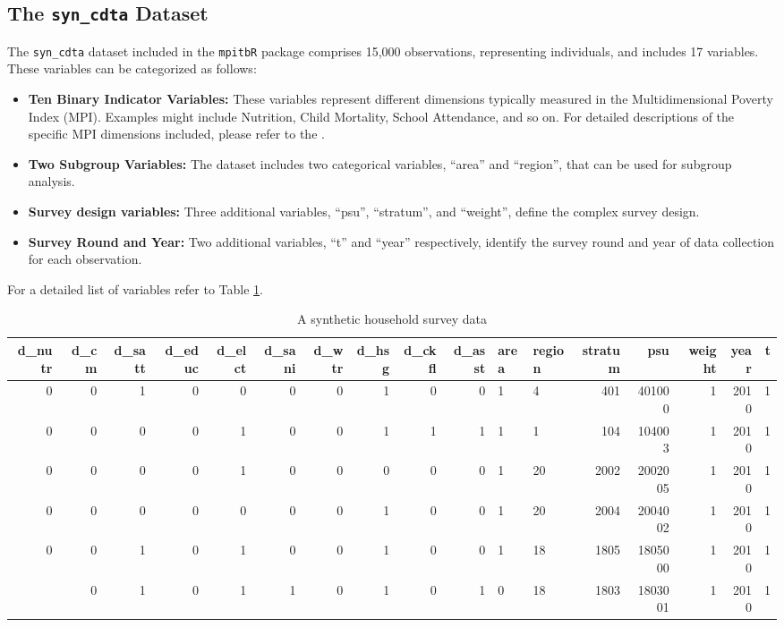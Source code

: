 \subsection{\texorpdfstring{The \texttt{syn\_cdta} Dataset}{The syn\_cdta Dataset}}\label{the-syn_cdta-dataset}

The \texttt{syn\_cdta} dataset included in the \texttt{mpitbR} package comprises 15,000 observations, representing individuals, and includes 17 variables. These variables can be categorized as follows:

\begin{itemize}
\item
  \textbf{Ten Binary Indicator Variables:} These variables represent different dimensions typically measured in the Multidimensional Poverty Index (MPI). Examples might include Nutrition, Child Mortality, School Attendance, and so on. For detailed descriptions of the specific MPI dimensions included, please refer to the \citet{gMPI-report2022}.
\item
  \textbf{Two Subgroup Variables:} The dataset includes two categorical variables, ``area'' and ``region'', that can be used for subgroup analysis.
\item
  \textbf{Survey design variables:} Three additional variables, ``psu'', ``stratum'', and ``weight'', define the complex survey design.
\item
  \textbf{Survey Round and Year:} Two additional variables, ``t'' and ``year'' respectively, identify the survey round and year of data collection for each observation.
\end{itemize}

For a detailed list of variables refer to Table \ref{tab:svydata-tab-static}.

\begin{table}
\centering
\caption{\label{tab:svydata-tab-static}A synthetic household survey data}
\centering
\fontsize{5}{7}\selectfont
\begin{tabular}[t]{rrrrrrrrrrllrrrrr}
\toprule
d\_nutr & d\_cm & d\_satt & d\_educ & d\_elct & d\_sani & d\_wtr & d\_hsg & d\_ckfl & d\_asst & area & region & stratum & psu & weight & year & t\\
\midrule
0 & 0 & 1 & 0 & 0 & 0 & 0 & 1 & 0 & 0 & 1 & 4 & 401 & 401000 & 1 & 2010 & 1\\
0 & 0 & 0 & 0 & 1 & 0 & 0 & 1 & 1 & 1 & 1 & 1 & 104 & 104003 & 1 & 2010 & 1\\
0 & 0 & 0 & 0 & 1 & 0 & 0 & 0 & 0 & 0 & 1 & 20 & 2002 & 2002005 & 1 & 2010 & 1\\
0 & 0 & 0 & 0 & 0 & 0 & 0 & 1 & 0 & 0 & 1 & 20 & 2004 & 2004002 & 1 & 2010 & 1\\
0 & 0 & 1 & 0 & 1 & 0 & 0 & 1 & 0 & 0 & 1 & 18 & 1805 & 1805000 & 1 & 2010 & 1\\
\addlinespace
0 & 0 & 1 & 0 & 1 & 1 & 0 & 1 & 0 & 1 & 0 & 18 & 1803 & 1803001 & 1 & 2010 & 1\\
\bottomrule
\end{tabular}
\end{table}

